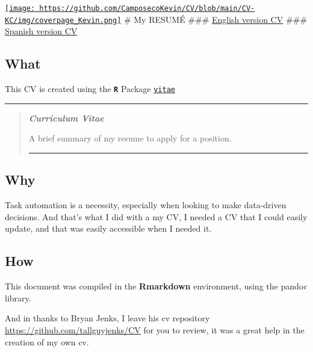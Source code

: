 \documentclass[
]{article}
\author{}
\date{\vspace{-2.5em}}
\begin{document}
\href{https://github.com/CamposecoKevin/CV/blob/main/CV-KC/KevinCamposeco_English.pdf}{\texttt{[image: https://github.com/CamposecoKevin/CV/blob/main/CV-KC/img/coverpage\_Kevin.png]}}
\# My RESUMÉ \#\#\#
\href{https://github.com/CamposecoKevin/CV/blob/main/CV-KC/KevinCamposeco_English.pdf}{English
version CV} \#\#\#
\href{https://github.com/CamposecoKevin/CV/blob/main/CV-KC/KevinCamposeco_Español.pdf}{Spanish
version CV}

\hypertarget{what}{%
\subsection{What}\label{what}}

This CV is created using the \textbf{\texttt{R}} Package
\href{https://github.com/mitchelloharawild/vitae}{\texttt{vitae}}

\begin{center}\rule{0.5\linewidth}{0.5pt}\end{center}

\begin{quote}
\emph{\textbf{Curriculum Vitae}}

A brief summary of my resume to apply for a position.

\begin{center}\rule{0.5\linewidth}{0.5pt}\end{center}
\end{quote}

\hypertarget{why}{%
\subsection{Why}\label{why}}

Task automation is a necessity, especially when looking to make
data-driven decisions. And that's what I did with a my CV, I needed a CV
that I could easily update, and that was easily accessible when I needed
it.

\hypertarget{how}{%
\subsection{How}\label{how}}

This document was compiled in the \textbf{Rmarkdown} environment, using
the pandoc library.

And in thanks to Bryan Jenks, I leave his cv repository
\url{https://github.com/tallguyjenks/CV} for you to review, it was a
great help in the creation of my own cv.
\end{document}

